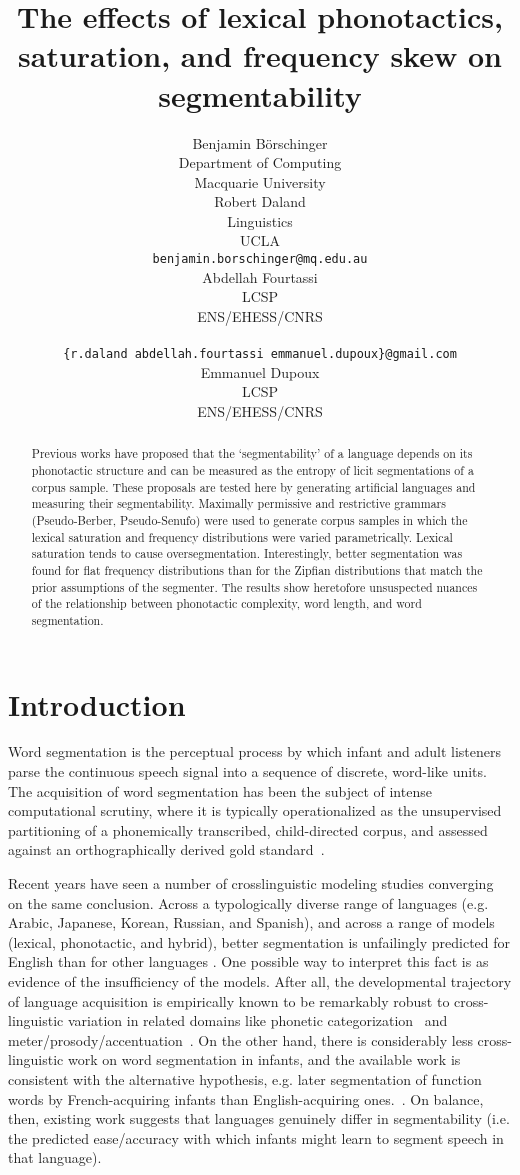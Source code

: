 \documentclass[11pt]{article}
\title{The effects of lexical phonotactics, saturation,
  and frequency skew on segmentability}
\author{Benjamin B{\"o}rschinger \\
    Department of Computing \\
    Macquarie University \\\And
  Robert Daland \\
    Linguistics \\
    UCLA \\
    {\tt benjamin.borschinger@mq.edu.au} \\\And
  Abdellah Fourtassi \\
    LCSP \\
    ENS/EHESS/CNRS \\
    \\
    {\tt \{r.daland\,abdellah.fourtassi\,emmanuel.dupoux\}@gmail.com} \\\And
  Emmanuel Dupoux \\
    LCSP \\
    ENS/EHESS/CNRS }
\date{}
\begin{document}
\maketitle
\begin{abstract}
  Previous works have proposed that the `segmentability' of a language
  depends on its phonotactic structure and can be measured as the
  entropy of licit segmentations of a corpus sample. These proposals
  are tested here by generating artificial languages and measuring
  their segmentability. Maximally permissive and restrictive grammars
  (Pseudo-Berber, Pseudo-Senufo) were used to generate corpus samples 
  in which the lexical saturation and frequency distributions were
  varied parametrically. Lexical saturation tends to cause oversegmentation.
  Interestingly, better segmentation was found for flat frequency
  distributions than for the Zipfian distributions that match the
  prior assumptions of the segmenter. The results show heretofore
  unsuspected nuances of the relationship between phonotactic complexity,
  word length, and word segmentation.
\end{abstract}


\section{Introduction}

Word segmentation is the perceptual process by which infant and adult listeners parse the continuous speech signal into a sequence of discrete, word-like units. The acquisition of word segmentation has been the subject of intense computational scrutiny, where it is typically operationalized as the unsupervised partitioning of a phonemically transcribed, child-directed corpus, and assessed against an orthographically derived gold standard~\cite{Goldwater09a,Daland11a,Pearl10b}.

Recent years have seen a number of crosslinguistic modeling studies converging on the same conclusion. Across a typologically diverse range of languages (e.g. Arabic, Japanese, Korean, Russian, and Spanish), and across a range of models (lexical, phonotactic, and hybrid), better segmentation is unfailingly predicted for English than for other languages \cite{Fleck08a,Daland09a,Daland11a,Fourtassi13a,Daland13a}. One possible way to interpret this fact is as evidence of the insufficiency of the models. After all, the developmental trajectory of language acquisition is empirically known to be remarkably robust to cross-linguistic variation in related domains like phonetic categorization~\cite{ref} and meter/prosody/accentuation~\cite{ref}. On the other hand, there is considerably less cross-linguistic work on word segmentation in infants, and the available work is consistent with the alternative hypothesis, e.g. later segmentation of function words by French-acquiring infants than English-acquiring ones.~\cite{ref}. On balance, then, existing work suggests that languages genuinely differ in segmentability (i.e. the predicted ease/accuracy with which infants might learn to segment speech in that language).
\end{document}
